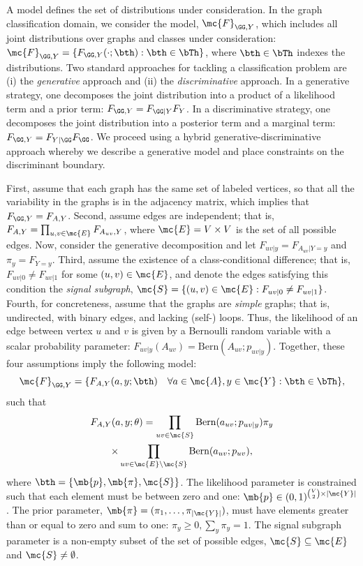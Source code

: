 \documentclass[10pt,journal,cspaper,compsoc]{IEEEtran}
\begin{document}
A model defines the set of distributions under consideration.  In the graph classification domain, we consider the model, $\mc{F}_{\GG,Y}$, which includes all joint distributions over graphs and classes under consideration: $\mc{F}_{\GG,Y}=\{F_{\GG, Y}(\cdot; \bth) : \bth \in \bTh\}$, where $\bth \in \bTh$ indexes the distributions.  Two standard approaches for tackling a classification problem are (i) the \emph{generative} approach and (ii) the \emph{discriminative} approach.  In a generative strategy, one decomposes the joint distribution into a product of a likelihood term and a prior term:  $F_{\GG,Y}=F_{\GG | Y}F_Y$.  In a discriminative strategy, one decomposes the joint distribution into a posterior term and a marginal term: $F_{\GG,Y}=F_{Y | \GG}F_{\GG}$.  We proceed using a hybrid generative-discriminative approach whereby we describe a generative model and place constraints on the discriminant boundary.

First,  assume that each graph has the same set of labeled vertices, so that all the variability in the graphs is in the adjacency matrix, which implies that $F_{\GG,Y}=F_{A,Y}$. Second, assume edges are independent; that is, $F_{A,Y}=\prod_{u,v \in \mc{E}} F_{A_{uv},Y}$, where 
$\mc{E}=V \times V$ is the set of all possible edges.  Now, consider the generative decomposition and let $F_{uv|y}=F_{A_{uv} | Y=y}$ and $\pi_y=F_{Y=y}$.  Third, assume the existence of a class-conditional difference; that is, $F_{uv|0} \neq F_{uv|1}$ for some $(u,v) \in \mc{E}$, and denote the edges satisfying this condition  the \emph{signal subgraph}, $\mc{S}=\{(u,v) \in \mc{E}: F_{uv|0} \neq F_{uv|1}\}$.  Fourth, for concreteness, assume that the graphs are \emph{simple} graphs; that is, undirected, with binary edges, and lacking (self-) loops.  Thus, the likelihood of an edge between vertex $u$ and $v$ is given by a Bernoulli random variable with a scalar probability parameter:  $F_{uv|y}(A_{uv})=\text{Bern}(A_{uv}; p_{uv|y})$. Together, these four assumptions imply the following model: 
\begin{equation}
\mc{F}_{\GG,Y}=\{F_{A, Y}(a,y; \bth) \quad \forall a\in\mc{A},y\in\mc{Y}: \bth \in \bTh\},
\end{equation} 
such that
\begin{multline}
F_{A,Y}(a,y; \theta) =  \prod_{uv \in \mc{S}} \text{Bern}(a_{uv}; p_{uv|y})  \pi_y 
\\ \times \prod_{uv \in \mc{E} \backslash \mc{S}} \text{Bern}(a_{uv}; p_{uv}),
\end{multline}
where $\bth=\{\mb{p},\mb{\pi},\mc{S}\}$. The likelihood parameter is constrained such that each element must be between zero and one: $\mb{p}\in (0,1)^{\binom{V}{2} \times |\mc{Y}|}$.  The prior parameter, $\mb{\pi}=(\pi_1, \ldots, \pi_{|\mc{Y}|})$, must have elements greater than or equal to zero and sum to one: $\pi_y \geq 0, \sum_y \pi_y=1$.  The signal subgraph parameter is a non-empty subset of the set of possible edges, $\mc{S} \subseteq \mc{E}$ and $\mc{S} \neq \emptyset$.
\end{document}
